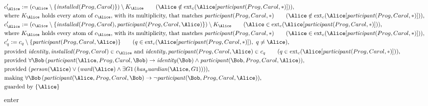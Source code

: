 \begin{align*}
&
c'_
{
\Alice
}
 := 
(c_
{
\Alice
}
 \setminus 
\{
\mathit{
installed
}
(
Prog
,
Carol
)
\}
) \setminus K_
{
\Alice
}
 \qquad (
\Alice
 \notin 
\mathrm{ext}_c(
\Alice
[
\mathit{
participant
}
(
Prog
,
Carol
,
\ast
)
]
)
)
,\\
&
\text{where } K_
{
\Alice
}
 \text{ holds every atom of } c_
{
\Alice
}
 \text{, with its multiplicity, that matches } 
\mathit{
participant
}
(
Prog
,
Carol
,
\ast
)
 \qquad (
\Alice
 \notin 
\mathrm{ext}_c(
\Alice
[
\mathit{
participant
}
(
Prog
,
Carol
,
\ast
)
]
)
)
,\\
&
c'_
{
\Alice
}
 := 
(c_
{
\Alice
}
 \setminus 
\{
\mathit{
installed
}
(
Prog
,
Carol
)
,
\mathit{
participant
}
(
Prog
,
Carol
,
\Alice
)
\}
) \setminus K_
{
\Alice
}
 \qquad (
\Alice
 \in 
\mathrm{ext}_c(
\Alice
[
\mathit{
participant
}
(
Prog
,
Carol
,
\ast
)
]
)
)
,\\
&
\text{where } K_
{
\Alice
}
 \text{ holds every atom of } c_
{
\Alice
}
 \text{, with its multiplicity, that matches } 
\mathit{
participant
}
(
Prog
,
Carol
,
\ast
)
 \qquad (
\Alice
 \in 
\mathrm{ext}_c(
\Alice
[
\mathit{
participant
}
(
Prog
,
Carol
,
\ast
)
]
)
)
,\\
&
c'_
q
 := 
c_
q
 \setminus 
\{
\mathit{
participant
}
(
Prog
,
Carol
,
\Alice
)
\}
 \qquad (
q
 \in 
\mathrm{ext}_c(
\Alice
[
\mathit{
participant
}
(
Prog
,
Carol
,
\ast
)
]
)
,\ 
q \neq 
\Alice
)
,\\
&
\text{provided } 
\mathit{
identity
}
,
\mathit{
installed
}
(
Prog
,
Carol
)
 \in c_
{
\Alice
}
 \text{ and } 
\mathit{
identity
}
,
\mathit{
participant
}
(
Prog
,
Carol
,
\Alice
)
 \in c_
q
 \qquad (
q \in 
\mathrm{ext}_c(
\Alice
[
\mathit{
participant
}
(
Prog
,
Carol
,
\ast
)
]
)
)
,\\
&
\text{provided } 
\forall 
\Bob
\,(
\mathit{
participant
}
(
\Alice
,
Prog
,
Carol
,
\Bob
)
\rightarrow
\mathit{
identity
}
(
\Bob
)
\land
\mathit{
participant
}
(
\Bob
,
Prog
,
Carol
,
\Alice
)
)
,\\
&
\text{provided } 
(
\mathit{
person
}
(
\Alice
)
\lor
(
\mathit{
ward
}
(
\Alice
)
\land
\exists 
G1
\,(
\mathit{
has_guardian
}
(
\Alice
,
G1
)
)
)
)
,\\
&
\text{making } 
\forall 
\Bob
\,(
\mathit{
participant
}
(
\Alice
,
Prog
,
Carol
,
\Bob
)
\rightarrow
\neg 
\mathit{
participant
}
(
\Bob
,
Prog
,
Carol
,
\Alice
)
)
,\\
&
\text{guarded by } \{
\Alice
\}
\end{align*}
\iffalse
enter
